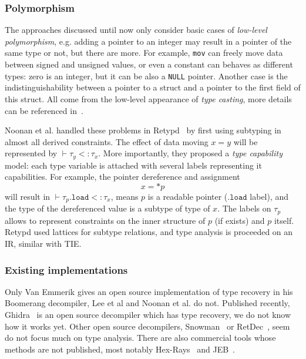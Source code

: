 \documentclass[compsoc,conference,a4paper,10pt,times]{IEEEtran}
\begin{document}
\subsubsection*{Polymorphism}
The approaches discussed until now only consider basic cases of \emph{low-level polymorphism}, e.g.
adding a pointer to an integer may result in a pointer of the same type or not, but there are more.
For example, \texttt{mov} can freely move data between signed and unsigned values, or even a constant
can behaves as different types: zero is an integer, but it can be also a
\texttt{NULL} pointer. Another case is the indistinguishability between a pointer to a struct and
a pointer to the first field of this struct. All come from the low-level appearance of
\emph{type casting}, more details can be referenced in~\cite{siff_coping_1999}.

Noonan et al. handled these problems in Retypd~\cite{noonan_polymorphic_2016} by first
using subtyping in almost all derived constraints. The effect of data moving $x = y$ will be represented by
$\vdash \tau_{y} <\colon \tau_{x}$. More importantly, they proposed a
\emph{type capability} model: each type variable is attached with several labels representing it capabilities.
For example, the pointer dereference and assignment
\begin{equation*}
  x = *p
\end{equation*}
will result in $\vdash \tau_{p}.\mathtt{load} <\colon \tau_{x}$, means $p$ is a readable pointer
($\mathtt{.load}$ label), and
the type of the dereferenced value is a subtype of type of $x$. The labels on $\tau_{p}$ allows to
represent constraints on the inner structure of $p$ (if exists) and $p$ itself.
Retypd used lattices for subtype relations, and type analysis is proceeded on an IR, similar with TIE.

\subsubsection*{Existing implementations}
Only Van Emmerik gives an open source implementation of type recovery in his Boomerang decompiler,
Lee et al and Noonan et al. do not. Published recently, Ghidra~\cite{noauthor_ghidra_nodate} is an
open source decompiler which has type recovery, we do not know how it works yet.
Other open source decompilers, Snowman~\cite{noauthor_snowman_nodate} or
RetDec~\cite{kroustek_retdec_2017}, seem do not focus much on type analysis.
There are also commercial tools whose methods are not published,
most notably Hex-Rays~\cite{noauthor_hex-rays_nodate} and JEB~\cite{noauthor_jeb_nodate}.
\end{document}
